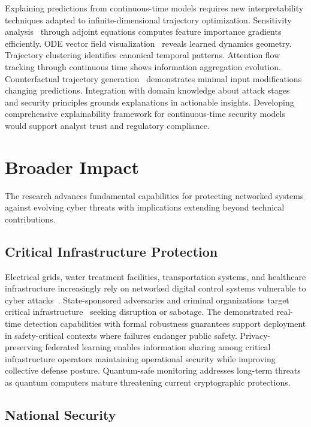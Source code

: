 Explaining predictions from continuous-time models requires new interpretability techniques adapted to infinite-dimensional trajectory optimization. Sensitivity analysis~\cite{saltelli2008global} through adjoint equations computes feature importance gradients efficiently. ODE vector field visualization~\cite{chen2018neural} reveals learned dynamics geometry. Trajectory clustering identifies canonical temporal patterns. Attention flow tracking through continuous time shows information aggregation evolution. Counterfactual trajectory generation~\cite{wachter2017counterfactual} demonstrates minimal input modifications changing predictions. Integration with domain knowledge about attack stages~\cite{hutchins2011intelligence} and security principles grounds explanations in actionable insights. Developing comprehensive explainability framework for continuous-time security models would support analyst trust and regulatory compliance.

\section*{Broader Impact}

The research advances fundamental capabilities for protecting networked systems against evolving cyber threats with implications extending beyond technical contributions.

\subsection*{Critical Infrastructure Protection}

Electrical grids, water treatment facilities, transportation systems, and healthcare infrastructure increasingly rely on networked digital control systems vulnerable to cyber attacks~\cite{colbert2016critical}. State-sponsored adversaries and criminal organizations target critical infrastructure~\cite{lewis2014critical} seeking disruption or sabotage. The demonstrated real-time detection capabilities with formal robustness guarantees support deployment in safety-critical contexts where failures endanger public safety. Privacy-preserving federated learning enables information sharing among critical infrastructure operators maintaining operational security while improving collective defense posture. Quantum-safe monitoring addresses long-term threats as quantum computers mature threatening current cryptographic protections.

\subsection*{National Security}

